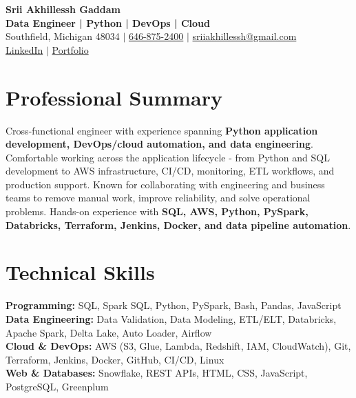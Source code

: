 \documentclass[letterpaper,10pt]{article}
\begin{document}
\fontsize{9.35pt}{10.45pt}\selectfont

\begin{center}
    {\LARGE \textbf{Srii Akhillessh Gaddam}} \\[-1pt]
    \textbf{Data Engineer | Python | DevOps | Cloud} \\[2pt]
    Southfield, Michigan 48034 $|$
    \href{tel:6468752400}{646-875-2400} $|$
    \href{mailto:sriiakhillessh@gmail.com}{sriiakhillessh@gmail.com} \\[1pt]
    \href{https://www.linkedin.com/in/srii-akhiilessh-gaddam-b48668191/}{LinkedIn} $|$
    \href{https://sriiakhillesshg.github.io/portfolio/}{Portfolio}
\end{center}
\vspace{-8pt}

\section{Professional Summary}
\small{Cross-functional engineer with experience spanning \textbf{Python application development, DevOps/cloud automation, and data engineering}. Comfortable working across the application lifecycle - from Python and SQL development to AWS infrastructure, CI/CD, monitoring, ETL workflows, and production support. Known for collaborating with engineering and business teams to remove manual work, improve reliability, and solve operational problems. Hands-on experience with \textbf{SQL, AWS, Python, PySpark, Databricks, Terraform, Jenkins, Docker, and data pipeline automation}.}

\section{Technical Skills}
\small{
\textbf{Programming:} SQL, Spark SQL, Python, PySpark, Bash, Pandas, JavaScript \\
\textbf{Data Engineering:} Data Validation, Data Modeling, ETL/ELT, Databricks, Apache Spark, Delta Lake, Auto Loader, Airflow \\
\textbf{Cloud \& DevOps:} AWS (S3, Glue, Lambda, Redshift, IAM, CloudWatch), Git, Terraform, Jenkins, Docker, GitHub, CI/CD, Linux \\
\textbf{Web \& Databases:} Snowflake, REST APIs, HTML, CSS, JavaScript, PostgreSQL, Greenplum
}

\end{document}
